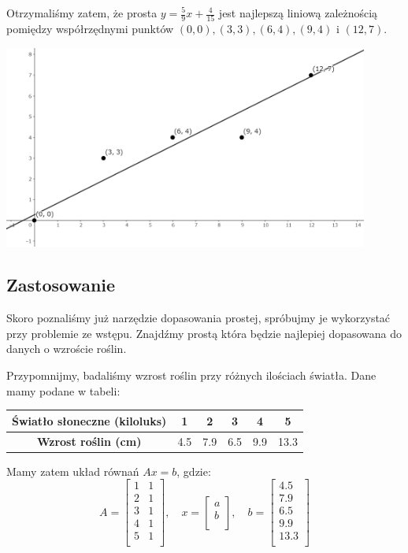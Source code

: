 \documentclass[a4paper,12pt]{article}
\begin{document}
Otrzymaliśmy zatem, że prosta \(y = \frac{5}{9}x + \frac{4}{15}\) jest najlepszą liniową zależnością pomiędzy współrzędnymi punktów \((0,0), (3,3), (6,4), (9,4)\) i \((12,7)\).  

\begin{center}
	\includegraphics[width=0.9\textwidth]{Figures/figure-3.png}
\end{center}

\subsection{Zastosowanie}
Skoro poznaliśmy już narzędzie dopasowania prostej, spróbujmy je wykorzystać przy problemie ze wstępu. Znajdźmy prostą która będzie najlepiej dopasowana do danych o wzroście roślin.

Przypomnijmy, badaliśmy wzrost roślin przy różnych ilościach światła. Dane mamy podane w tabeli:
\begin{table}[h]
    \centering
    \begin{tabular}{|c|c|c|c|c|c|}
        \hline
        \textbf{Światło słoneczne (kiloluks)} & 1 & 2 & 3 & 4 & 5 \\
		\hline
        \textbf{Wzrost roślin (cm)} & 4.5 & 7.9 & 6.5 & 9.9 & 13.3 \\
        \hline
    \end{tabular}
\end{table}

Mamy zatem układ równań \(Ax = b\), gdzie: 
\[
	A = 
	\begin{bmatrix}
		1 &  1 \\
		2 &  1 \\
		3 &  1 \\
		4 &  1 \\
		5 &  1 \\
	\end{bmatrix},
	\quad
	x = 
	\begin{bmatrix}
		 a \\
		 b \\
	\end{bmatrix},
	\quad
	b = 
	\begin{bmatrix}
		 4.5 \\
		 7.9 \\
		 6.5 \\
		 9.9 \\
		 13.3 \\
	\end{bmatrix}
\]
\end{document}
